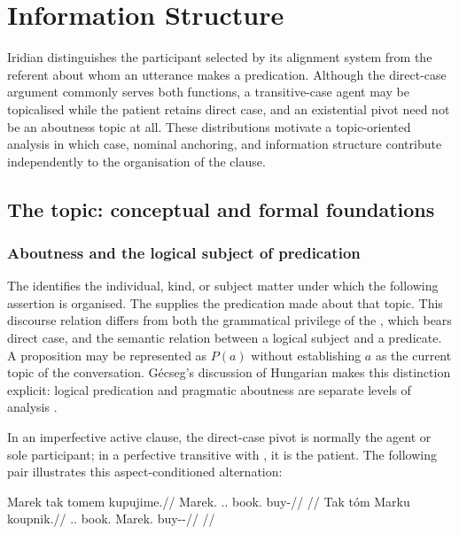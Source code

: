 \chapter{Information Structure}\label{ch:infstr}
\label{sec:topic-comment}%

Iridian distinguishes the participant selected by its alignment system from
 the referent about whom an utterance makes a predication. Although the
 direct-case argument commonly serves both functions, a transitive-case agent
 may be topicalised while the patient retains direct case, and an existential
 pivot need not be an aboutness topic at all. These distributions motivate a
 topic-oriented analysis in which case, nominal anchoring, and information
 structure contribute independently to the organisation of the clause.

\section{The topic: conceptual and formal foundations}\label{sec:tc-foundations}
\subsection{Aboutness and the logical subject of predication}
\label{sec:tc-logical-subject}

The  identifies the individual, kind, or subject matter
 under which the following assertion is organised. The  supplies
 the predication made about that topic. This discourse relation differs from
 both the grammatical privilege of the , which bears
 direct case, and the semantic relation between a logical subject and a
 predicate. A proposition may be represented as $P(a)$ without establishing
 $a$ as the current topic of the conversation. Gécseg's discussion of Hungarian
 makes this distinction explicit: logical predication and pragmatic aboutness
 are separate levels of analysis \cite{gecseg2006}.

In an imperfective active clause, the direct-case pivot is normally the agent
 or sole participant; in a perfective transitive with , it is the
 patient. The following pair illustrates this aspect-conditioned alternation:

\pex\label{ex:tc-topic-subj}
\a
\begingl
\gla Marek tak tomem kupujime.//
\glb Marek.\Dir{} \Dem{}.\Prox{}.\Dir{} book.\Ind{} buy-\Prog{}//
\glft {}
      //
\endgl
\a
\begingl
\gla Tak tóm Marku koupnik.//
\glb \Dem{}.\Prox{}.\Dir{} book.\Dir{} Marek.\Trs{} buy-\Trs{}-\Pf{}//
\glft {}
      //
\endgl
\xe

